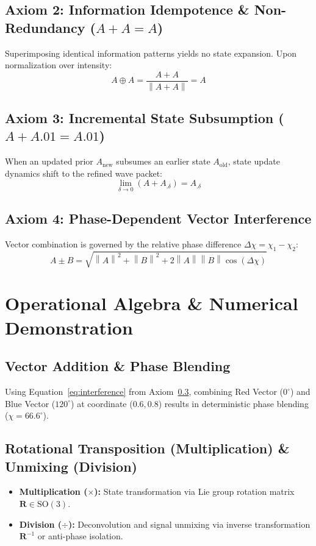 \documentclass[12pt, a4paper]{article}
\providecommand{\norm}[1]{\left\lVert#1\right\rVert}
\begin{document}
\subsection{Axiom 2: Information Idempotence \& Non-Redundancy ($A + A = A$)}
\label{axiom:idempotence}
Superimposing identical information patterns yields no state expansion. Upon normalization over intensity:
\begin{equation}
    A \oplus A = \frac{A + A}{\norm{A + A}} = A
    \label{eq:idempotence}
\end{equation}

\subsection{Axiom 3: Incremental State Subsumption ($A + A.01 = A.01$)}
\label{axiom:subsumption}
When an updated prior $A_{\text{new}}$ subsumes an earlier state $A_{\text{old}}$, state update dynamics shift to the refined wave packet:
\begin{equation}
    \lim_{\delta \to 0} (A + A_{.\delta}) = A_{.\delta}
\end{equation}

\subsection{Axiom 4: Phase-Dependent Vector Interference}
\label{axiom:interference}
Vector combination is governed by the relative phase difference $\Delta\chi = \chi_1 - \chi_2$:
\begin{equation}
    A \pm B = \sqrt{\norm{A}^2 + \norm{B}^2 + 2\norm{A}\norm{B}\cos(\Delta\chi)}
    \label{eq:interference}
\end{equation}

\section{Operational Algebra \& Numerical Demonstration}

\subsection{Vector Addition \& Phase Blending}
Using Equation~\eqref{eq:interference} from Axiom~\ref{axiom:interference}, combining Red Vector ($0^\circ$) and Blue Vector ($120^\circ$) at coordinate ($0.6, 0.8$) results in deterministic phase blending ($\chi = 66.6^\circ$).

\subsection{Rotational Transposition (Multiplication) \& Unmixing (Division)}
\begin{itemize}
    \item \textbf{Multiplication ($\times$):} State transformation via Lie group rotation matrix $\mathbf{R} \in \mathrm{SO}(3)$.
    \item \textbf{Division ($\div$):} Deconvolution and signal unmixing via inverse transformation $\mathbf{R}^{-1}$ or anti-phase isolation.
\end{itemize}
\end{document}
